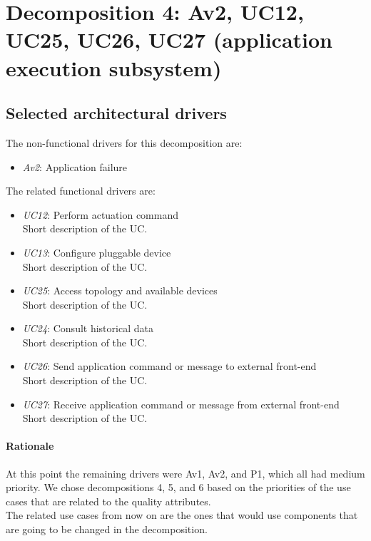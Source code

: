 \section{Decomposition 4: Av2, UC12, UC25, UC26, UC27 (application execution subsystem)}


\subsection{Selected architectural drivers}
    The non-functional drivers for this decomposition are:
    \begin{itemize}
    	\item \emph{Av2}: Application failure
    \end{itemize}

    The related functional drivers are:
    \begin{itemize}
        \item \emph{UC12}: Perform actuation command \\
              Short description of the UC.
        \item \emph{UC13}: Configure pluggable device \\
              Short description of the UC.
        \item \emph{UC25}: Access topology and available devices \\
              Short description of the UC.
        \item \emph{UC24}: Consult historical data \\
              Short description of the UC.
        \item \emph{UC26}: Send application command or message to external front-end \\
              Short description of the UC.
        \item \emph{UC27}: Receive application command or message from external front-end \\
              Short description of the UC.
    \end{itemize}

    \paragraph{Rationale}
        At this point the remaining drivers were Av1, Av2, and P1,
        which all had medium priority. We chose decompositions 4, 5,
        and 6 based on the priorities of the use cases that are related to the quality attributes. \\
        The related use cases from now on are the ones that would use components
        that are going to be changed in the decomposition.


